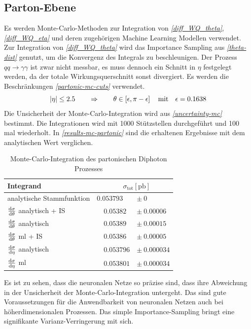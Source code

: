 \subsection{Parton-Ebene}
Es werden Monte-Carlo-Methoden zur Integration von \textit{\autoref{diff_WQ_theta}}, \textit{\autoref{diff_WQ_eta}} und deren zugehörigen Machine Learning Modellen verwendet. Zur Integration von \textit{\autoref{diff_WQ_theta}} wird das Importance Sampling aus \textit{\autoref{theta-dist}} genutzt, um die Konvergenz des Integrals zu beschleunigen. Der Prozess $qq \rightarrow \gamma \gamma$ ist zwar nicht messbar, es muss dennoch ein Schnitt in $\eta$ festgelegt werden, da der totale Wirkungsquerschnitt sonst divergiert. Es werden die Beschränkungen \textit{\autoref{partonic-mc-cuts}} verwendet.
\begin{equation}
\abs{\eta} \leq 2.5 \qquad \Rightarrow \qquad \theta \in \left[\epsilon, \pi - \epsilon \right] \quad \text{mit} \quad \epsilon = 0.1638
\label{partonic-mc-cuts}
\end{equation}
Die Unsicherheit der Monte-Carlo-Integration wird aus \textit{\autoref{uncertainty-mc}} bestimmt. Die Integrationen wird mit 1000 Stützstellen durchgeführt und 100 mal wiederholt. In \textit{\autoref{results-mc-partonic}} sind die erhaltenen Ergebnisse mit dem analytischen Wert verglichen.
\begin{table}[bh]
	\centering
	\begin{tabular}{lll}
		Integrand & \multicolumn{2}{c}{$\quad \sigma_{\text{tot}}[\text{pb}]$} \\
		\hline
		analytische Stammfunktion& \quad  $0.053793$ &$\pm~ 0$\\
		$\derivative{\sigma}{\theta}$ analytisch + IS & $\quad 0.05382 $&$\pm~ 0.00006 $ \\
		$\derivative{\sigma}{\theta}$ analytisch & $\quad 0.05389$ &$\pm~ 0.00015 $ \\
		$\derivative{\sigma}{\theta}$ ml + IS &$\quad 0.05386$ &$\pm~ 0.00005$ \\
		$\derivative{\sigma}{\eta}$ analytisch & $\quad 0.053796 $&$\pm~ 0.000034$ \\
		$\derivative{\sigma}{\eta}$ ml & $\quad 0.053801 $&$\pm~ 0.000034$ \\
	\end{tabular}
	\caption{Monte-Carlo-Integration des partonischen Diphoton Prozesses}
	\label{results-mc-partonic}
\end{table}
Es ist zu sehen, dass die neuronalen Netze so präzise sind, dass ihre Abweichung in der Unsicherheit der Monte-Carlo-Integration untergeht. Das sind gute Voraussetzungen für die Anwendbarkeit von neuronalen Netzen auch bei höherdimensionalen Prozessen. Das simple Importance-Sampling bringt eine signifikante Varianz-Verringerung mit sich.
